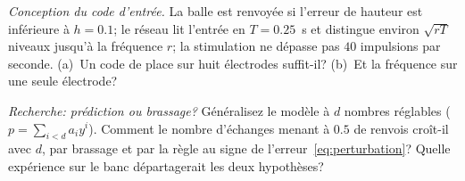 \begin{exercise}[\lvlB]
\label{ex:22:6}
\emph{Conception du code d'entrée.} La balle est renvoyée si l'erreur de hauteur est inférieure à $h=0.1$; le réseau lit l'entrée en $T=0.25$~s et distingue environ $\sqrt{rT}$ niveaux jusqu'à la fréquence $r$; la stimulation ne dépasse pas $40$ impulsions par seconde. (a)~Un code de place sur huit électrodes suffit-il? (b)~Et la fréquence sur une seule électrode?
\end{exercise}

\begin{exercise}[\lvlC]
\label{ex:22:7}
\emph{Recherche: prédiction ou brassage?} Généralisez le modèle à $d$ nombres réglables ($p=\sum_{i<d}a_iy^i$). Comment le nombre d'échanges menant à $0.5$ de renvois croît-il avec $d$, par brassage et par la règle au signe de l'erreur~\eqref{eq:perturbation}? Quelle expérience sur le banc départagerait les deux hypothèses?
\end{exercise}
